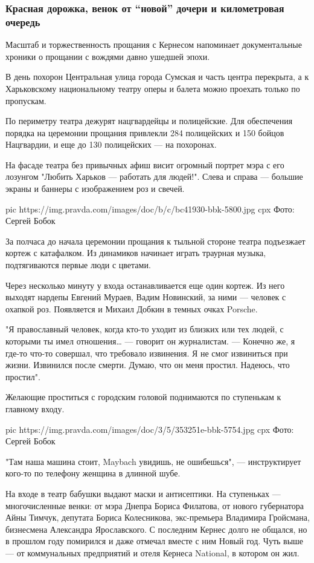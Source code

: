 \subsubsection{Красная дорожка, венок от \enquote{новой} дочери и километровая очередь}

Масштаб и торжественность прощания с Кернесом напоминает документальные хроники
о прощании с вождями давно ушедшей эпохи. 

В день похорон Центральная улица города Сумская и часть центра перекрыта, а к
Харьковскому национальному театру оперы и балета можно проехать только по
пропускам. 

По периметру театра дежурят нацгвардейцы и полицейские. Для обеспечения порядка
на церемонии прощания привлекли 284 полицейских и 150 бойцов Нацгвардии, и еще
до 130 полицейских — на похоронах. 

На фасаде театра без привычных афиш висит огромный портрет мэра с его лозунгом
"Любить Харьков — работать для людей!". Слева и справа — большие экраны и
баннеры с изображением роз и свечей.

\ifcmt
pic https://img.pravda.com/images/doc/b/c/bc41930-bbk-5800.jpg
cpx Фото: Сергей Бобок
\fi

За полчаса до начала церемонии прощания к тыльной стороне театра подъезжает
кортеж с катафалком. Из динамиков начинает играть траурная музыка,
подтягиваются первые люди с цветами.

Через несколько минуту у входа останавливается еще один кортеж. Из него выходят
нардепы Евгений Мураев, Вадим Новинский, за ними — человек с охапкой роз.
Появляется и Михаил Добкин в темных очках Porsche.

"Я православный человек, когда кто-то уходит из близких или тех людей, с
которыми ты имел отношения… — говорит он журналистам. — Конечно же, я где-то
что-то совершал, что требовало извинения. Я не смог извиниться при жизни.
Извинился после смерти. Думаю, что он меня простил. Надеюсь, что простил".

Желающие проститься с городским головой поднимаются по ступенькам к главному
входу.

\ifcmt
pic https://img.pravda.com/images/doc/3/5/353251e-bbk-5754.jpg
cpx Фото: Сергей Бобок
\fi

"Там наша машина стоит, Maybach увидишь, не ошибешься", — инструктирует кого-то
по телефону женщина в длинной шубе.

На входе в театр бабушки выдают маски и антисептики. На ступеньках —
многочисленные венки: от мэра Днепра Бориса Филатова, от нового губернатора
Айны Тимчук, депутата Бориса Колесникова, экс-премьера Владимира Гройсмана,
бизнесмена Александра Ярославского. С последним Кернес долго не общался, но в
прошлом году помирился и даже отмечал вместе с ним Новый год. Чуть выше — от
коммунальных предприятий и отеля Кернеса National, в котором он жил.

